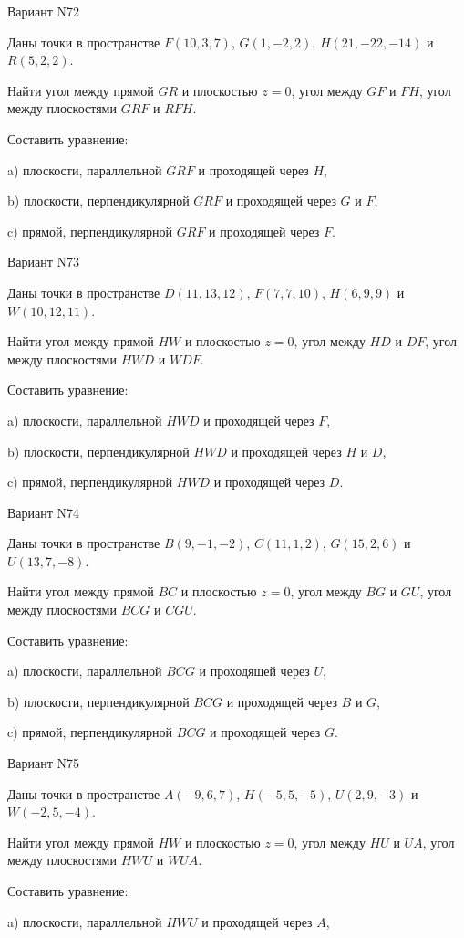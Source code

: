 \documentclass[11pt]{report}
\begin{document}
Вариант N72

Даны точки в пространстве
$F(10, 3, 7)$, $G(1, -2, 2)$, $H(21, -22, -14)$ и
$R(5, 2, 2)$.

Найти угол между прямой $GR$ и плоскостью $z = 0$, угол между $GF$ и $FH$, угол между плоскостями $GRF$ 
и $RFH$.

Составить уравнение: 

a) плоскости, параллельной $GRF$ и проходящей через $H$,

b) плоскости, перпендикулярной $GRF$ и проходящей через $G$ и $F$,

c) прямой, перпендикулярной $GRF$ и проходящей через $F$.

Вариант N73

Даны точки в пространстве
$D(11, 13, 12)$, $F(7, 7, 10)$, $H(6, 9, 9)$ и
$W(10, 12, 11)$.

Найти угол между прямой $HW$ и плоскостью $z = 0$, угол между $HD$ и $DF$, угол между плоскостями $HWD$ 
и $WDF$.

Составить уравнение: 

a) плоскости, параллельной $HWD$ и проходящей через $F$,

b) плоскости, перпендикулярной $HWD$ и проходящей через $H$ и $D$,

c) прямой, перпендикулярной $HWD$ и проходящей через $D$.

Вариант N74

Даны точки в пространстве
$B(9, -1, -2)$, $C(11, 1, 2)$, $G(15, 2, 6)$ и
$U(13, 7, -8)$.

Найти угол между прямой $BC$ и плоскостью $z = 0$, угол между $BG$ и $GU$, угол между плоскостями $BCG$ 
и $CGU$.

Составить уравнение: 

a) плоскости, параллельной $BCG$ и проходящей через $U$,

b) плоскости, перпендикулярной $BCG$ и проходящей через $B$ и $G$,

c) прямой, перпендикулярной $BCG$ и проходящей через $G$.

Вариант N75

Даны точки в пространстве
$A(-9, 6, 7)$, $H(-5, 5, -5)$, $U(2, 9, -3)$ и
$W(-2, 5, -4)$.

Найти угол между прямой $HW$ и плоскостью $z = 0$, угол между $HU$ и $UA$, угол между плоскостями $HWU$ 
и $WUA$.

Составить уравнение: 

a) плоскости, параллельной $HWU$ и проходящей через $A$,
\end{document}
